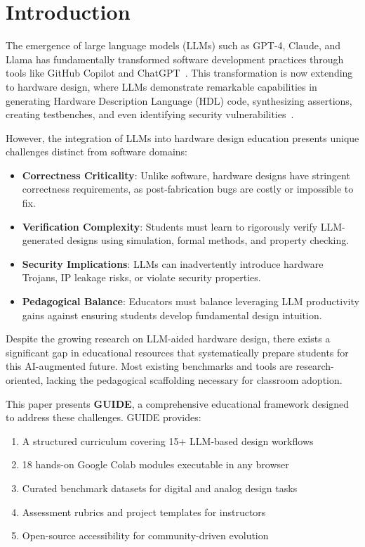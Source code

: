 \documentclass[10pt,conference]{IEEEtran}
\begin{document}
\section{Introduction}

The emergence of large language models (LLMs) such as GPT-4, Claude, and Llama has fundamentally transformed software development practices through tools like GitHub Copilot and ChatGPT~\cite{chen2021evaluating}. This transformation is now extending to hardware design, where LLMs demonstrate remarkable capabilities in generating Hardware Description Language (HDL) code, synthesizing assertions, creating testbenches, and even identifying security vulnerabilities~\cite{autochip,chipchat}.

However, the integration of LLMs into hardware design education presents unique challenges distinct from software domains:

\begin{itemize}
    \item \textbf{Correctness Criticality}: Unlike software, hardware designs have stringent correctness requirements, as post-fabrication bugs are costly or impossible to fix.
    \item \textbf{Verification Complexity}: Students must learn to rigorously verify LLM-generated designs using simulation, formal methods, and property checking.
    \item \textbf{Security Implications}: LLMs can inadvertently introduce hardware Trojans, IP leakage risks, or violate security properties.
    \item \textbf{Pedagogical Balance}: Educators must balance leveraging LLM productivity gains against ensuring students develop fundamental design intuition.
\end{itemize}

Despite the growing research on LLM-aided hardware design, there exists a significant gap in educational resources that systematically prepare students for this AI-augmented future. Most existing benchmarks and tools are research-oriented, lacking the pedagogical scaffolding necessary for classroom adoption.

This paper presents \textbf{GUIDE}, a comprehensive educational framework designed to address these challenges. GUIDE provides:

\begin{enumerate}
    \item A structured curriculum covering 15+ LLM-based design workflows
    \item 18 hands-on Google Colab modules executable in any browser
    \item Curated benchmark datasets for digital and analog design tasks
    \item Assessment rubrics and project templates for instructors
    \item Open-source accessibility for community-driven evolution
\end{enumerate}
\end{document}
